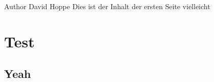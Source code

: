\begin{DoxyAuthor}{\-Author}
\-David \-Hoppe \-Dies ist der \-Inhalt der ersten \-Seite vielleicht
\end{DoxyAuthor}
\hypertarget{index_Test}{}\section{\-Test}\label{index_Test}
\hypertarget{/home/david/Dropbox/Master/Info/master_thesis/nltk-uima/MainPage.py_Yeah}{}\subsection{\-Yeah}\label{/home/david/Dropbox/Master/Info/master_thesis/nltk-uima/MainPage.py_Yeah}

